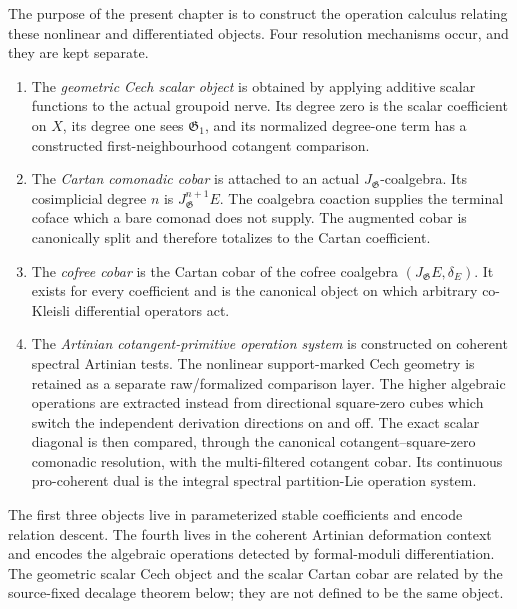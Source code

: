 The purpose of the present chapter is to construct the operation calculus
relating these nonlinear and differentiated objects.  Four resolution
mechanisms occur, and they are kept separate.

\begin{enumerate}
    \item The \emph{geometric Cech scalar object} is obtained by applying
    additive scalar functions to the actual groupoid nerve.  Its degree zero is
    the scalar coefficient on $X$, its degree one sees $\mathfrak G_1$, and its
    normalized degree-one term has a constructed first-neighbourhood cotangent
    comparison.

    \item The \emph{Cartan comonadic cobar} is attached to an actual
    $J_{\mathfrak G}$-coalgebra.  Its cosimplicial degree $n$ is
    $J_{\mathfrak G}^{n+1}E$.  The coalgebra coaction supplies the terminal
    coface which a bare comonad does not supply.  The augmented cobar is
    canonically split and therefore totalizes to the Cartan coefficient.

    \item The \emph{cofree cobar} is the Cartan cobar of the cofree coalgebra
    $(J_{\mathfrak G}E,\delta_E)$.  It exists for every coefficient and is the
    canonical object on which arbitrary co-Kleisli differential operators act.

    \item The \emph{Artinian cotangent-primitive operation system} is constructed
    on coherent spectral Artinian tests.  The nonlinear support-marked Cech
    geometry is retained as a separate raw/formalized comparison layer.  The
    higher algebraic operations are extracted instead from directional
    square-zero cubes which switch the independent derivation directions on
    and off.  The exact scalar diagonal is then compared, through the canonical
    cotangent--square-zero comonadic resolution, with the multi-filtered
    cotangent cobar.  Its continuous pro-coherent dual is the integral spectral
    partition-Lie operation system.
\end{enumerate}

The first three objects live in parameterized stable coefficients and encode
relation descent.  The fourth lives in the coherent Artinian deformation
context and encodes the algebraic operations detected by formal-moduli
differentiation.  The geometric scalar Cech object and the scalar Cartan
cobar are related by the source-fixed decalage theorem below; they are not
defined to be the same object.

